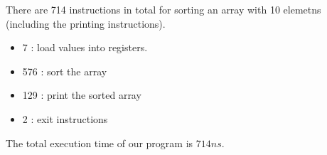 \documentclass[12pt,a4paper]{article}
\begin{document}
\begin{enumerate}
        There are 714 instructions in total for sorting an array with 10 elemetns (including the printing instructions).

        \begin{itemize}
          \item 7 : load values into registers.
          \item 576 : sort the array
          \item 129 : print the sorted array
          \item 2 : exit instructions
        \end{itemize}

        The total execution time of our program is $714 ns$.

\end{enumerate}

\end{document}
